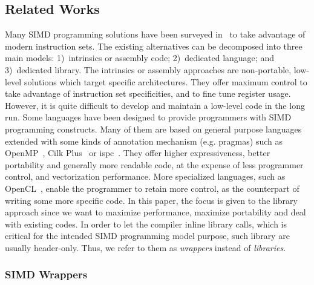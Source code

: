 \subsection{Related Works}

Many SIMD programming solutions have been surveyed in~\cite{Pohl2016} to take
advantage of modern instruction sets. The existing alternatives can be
decomposed into three main models: 1)~intrinsics or assembly code; 2)~dedicated
language; and 3)~dedicated library. The intrinsics or assembly approaches are
non-portable, low-level solutions which target specific architectures. They
offer maximum control to take advantage of instruction set specificities, and to
fine tune register usage. However, it is quite difficult to develop and maintain
a low-level code in the long run. Some languages have been designed to provide
programmers with SIMD programming constructs. Many of them are based on general
purpose languages extended with some kinds of annotation mechanism (e.g.
pragmas) such as OpenMP~\cite{OpenMP2013}, Cilk Plus~\cite{Robison2013} or
ispc~\cite{Pharr2012}. They offer higher expressiveness, better portability and
generally more readable code, at the expense of less programmer control, and
vectorization performance. More specialized languages, such as
OpenCL~\cite{Howes2015}, enable the programmer to retain more control, as the
counterpart of writing some more specific code.
In this paper, the focus is given to the library approach since we want to
maximize performance, maximize portability and deal with existing \Cxx codes. In
order to let the compiler inline library calls, which is critical for the
intended SIMD programming model purpose, such library are usually header-only.
Thus, we refer to them as \textit{wrappers} instead of \textit{libraries}.

\subsubsection{\Cxx SIMD Wrappers}

